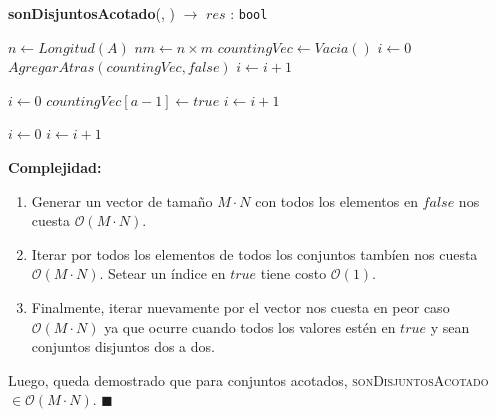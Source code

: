 \documentclass[10pt, a4paper]{article}
\newcommand{\bigO}{\mathcal{O}}
\newcommand{\asignar}[2]{$#1 \gets #2$}
\begin{document}
\begin{algorithm}[H]
	\caption{\textbf{sonDisjuntosAcotado}(, ) $\to$ $res$ : \texttt{bool}}
	\begin{algorithmic}[1]
    \State \asignar{n}{Longitud(A)}
    \State \asignar{nm}{n \times m}
    \State \asignar{countingVec}{Vacia()}
    \State \asignar{i}{0}
     \Comment{$\bigO(M \cdot N)$}
      \State $AgregarAtras(countingVec, false)$ \Comment{$\bigO(1)$}
      \State \asignar{i}{i + 1}
    \EndFor

    \State \asignar{i}{0}
     \Comment{$\bigO(M \cdot N)$}
       \Comment{$\bigO(M)$}
        \State \asignar{countingVec[a - 1]}{true} \Comment{$\bigO(1)$}
      \EndFor
      \State \asignar{i}{i + 1}
    \EndFor

    \State \asignar{i}{0}
     \Comment{$\bigO(M \cdot N)$}
        \State {}
      \EndIf
      \State \asignar{i}{i + 1}
    \EndFor

    \State {}
		\medskip
	\end{algorithmic}
\end{algorithm}

\textbf{Complejidad: }
\begin{enumerate}
  \item Generar un vector de tama\~no $M \cdot N$ con todos los elementos en $false$ nos cuesta $\bigO(M \cdot N)$.
  \item Iterar por todos los elementos de todos los conjuntos tamb\'ien nos cuesta $\bigO(M \cdot N)$. Setear un \'indice en $true$ tiene costo $\bigO(1)$.
  \item Finalmente, iterar nuevamente por el vector nos cuesta en peor caso $\bigO(M \cdot N)$ ya que ocurre cuando todos los valores est\'en en $true$ y sean conjuntos disjuntos dos a dos.
\end{enumerate}

Luego, queda demostrado que para conjuntos acotados, \textsc{sonDisjuntosAcotado} $\in \bigO(M \cdot N)$. $\blacksquare$
\end{document}
